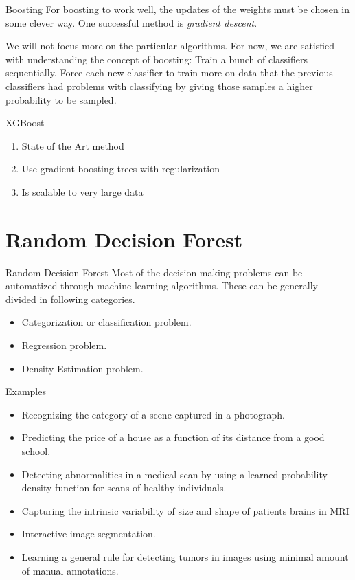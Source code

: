 \documentclass[11pt,aspectratio=1610,usenames,dvipsnames]{beamer} %
\begin{document}
\begin{frame}{Boosting}
	For boosting to work well, the updates of the weights must be chosen in some clever way. One successful method is \textit{gradient descent}.
	
	We will not focus more on the particular algorithms. For now, we are satisfied with understanding the concept of boosting:
	Train a bunch of classifiers sequentially. Force each new classifier to train more on data that the previous classifiers had problems with classifying by giving those samples a higher probability to be sampled.
\end{frame}


\begin{frame}{XGBoost}
	
	\begin{enumerate}

		\item State of the Art method
		\item Use gradient boosting trees with regularization
		\item Is scalable to very large data
	\end{enumerate}
\end{frame}


\section{Random Decision Forest}
\begin{frame}{Random Decision Forest}
	Most of the decision making problems can be automatized through machine learning algorithms. These can be generally divided in following categories.\\
	\begin{itemize}
		\item Categorization or classification problem.
		\item Regression problem.
		\item Density Estimation problem.
	\end{itemize}
\end{frame}
\begin{frame}{Examples}
\begin{itemize}
	\item Recognizing the category of a scene captured in a photograph.
	\item Predicting the price of a house as a function of its distance
	from a good school.
	\item Detecting abnormalities in a medical scan by using a learned probability density
	function for scans of healthy individuals.
	\item Capturing the intrinsic variability of size and shape of patients brains in MRI
	\item Interactive image segmentation.
	\item Learning a general rule for detecting tumors in images using minimal amount of manual annotations.
\end{itemize}
\end{frame}
\end{document}
